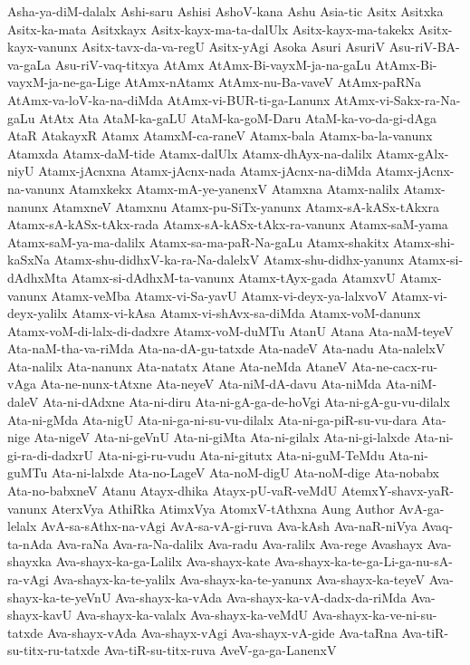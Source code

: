 {Asha-ya-diM-dalalx
Ashi-saru
Ashisi
AshoV-kana
Ashu
Asia-tic
Asitx
Asitxka
Asitx-ka-mata
Asitxkayx
Asitx-kayx-ma-ta-dalUlx
Asitx-kayx-ma-takekx
Asitx-kayx-vanunx
Asitx-tavx-da-va-regU
Asitx-yAgi
Asoka
Asuri
AsuriV
Asu-riV-BA-va-gaLa
Asu-riV-vaq-titxya
AtAmx
AtAmx-Bi-vayxM-ja-na-gaLu
AtAmx-Bi-vayxM-ja-ne-ga-Lige
AtAmx-nAtamx
AtAmx-nu-Ba-vaveV
AtAmx-paRNa
AtAmx-va-loV-ka-na-diMda
AtAmx-vi-BUR-ti-ga-Lanunx
AtAmx-vi-Sakx-ra-Na-gaLu
AtAtx
Ata
AtaM-ka-gaLU
AtaM-ka-goM-Daru
AtaM-ka-vo-da-gi-dAga
AtaR
AtakayxR
Atamx
AtamxM-ca-raneV
Atamx-bala
Atamx-ba-la-vanunx
Atamxda
Atamx-daM-tide
Atamx-dalUlx
Atamx-dhAyx-na-dalilx
Atamx-gAlx-niyU
Atamx-jAcnxna
Atamx-jAcnx-nada
Atamx-jAcnx-na-diMda
Atamx-jAcnx-na-vanunx
Atamxkekx
Atamx-mA-ye-yanenxV
Atamxna
Atamx-nalilx
Atamx-nanunx
AtamxneV
Atamxnu
Atamx-pu-SiTx-yanunx
Atamx-sA-kASx-tAkxra
Atamx-sA-kASx-tAkx-rada
Atamx-sA-kASx-tAkx-ra-vanunx
Atamx-saM-yama
Atamx-saM-ya-ma-dalilx
Atamx-sa-ma-paR-Na-gaLu
Atamx-shakitx
Atamx-shi-kaSxNa
Atamx-shu-didhxV-ka-ra-Na-dalelxV
Atamx-shu-didhx-yanunx
Atamx-si-dAdhxMta
Atamx-si-dAdhxM-ta-vanunx
Atamx-tAyx-gada
AtamxvU
Atamx-vanunx
Atamx-veMba
Atamx-vi-Sa-yavU
Atamx-vi-deyx-ya-lalxvoV
Atamx-vi-deyx-yalilx
Atamx-vi-kAsa
Atamx-vi-shAvx-sa-diMda
Atamx-voM-danunx
Atamx-voM-di-lalx-di-dadxre
Atamx-voM-duMTu
AtanU
Atana
Ata-naM-teyeV
Ata-naM-tha-va-riMda
Ata-na-dA-gu-tatxde
Ata-nadeV
Ata-nadu
Ata-nalelxV
Ata-nalilx
Ata-nanunx
Ata-natatx
Atane
Ata-neMda
AtaneV
Ata-ne-cacx-ru-vAga
Ata-ne-nunx-tAtxne
Ata-neyeV
Ata-niM-dA-davu
Ata-niMda
Ata-niM-daleV
Ata-ni-dAdxne
Ata-ni-diru
Ata-ni-gA-ga-de-hoVgi
Ata-ni-gA-gu-vu-dilalx
Ata-ni-gMda
Ata-nigU
Ata-ni-ga-ni-su-vu-dilalx
Ata-ni-ga-piR-su-vu-dara
Ata-nige
Ata-nigeV
Ata-ni-geVnU
Ata-ni-giMta
Ata-ni-gilalx
Ata-ni-gi-lalxde
Ata-ni-gi-ra-di-dadxrU
Ata-ni-gi-ru-vudu
Ata-ni-gitutx
Ata-ni-guM-TeMdu
Ata-ni-guMTu
Ata-ni-lalxde
Ata-no-LageV
Ata-noM-digU
Ata-noM-dige
Ata-nobabx
Ata-no-babxneV
Atanu
Atayx-dhika
Atayx-pU-vaR-veMdU
AtemxY-shavx-yaR-vanunx
AterxVya
AthiRka
AtimxVya
AtomxV-tAthxna
Aung
Author
AvA-ga-lelalx
AvA-sa-sAthx-na-vAgi
AvA-sa-vA-gi-ruva
Ava-kAsh
Ava-naR-niVya
Avaq-ta-nAda
Ava-raNa
Ava-ra-Na-dalilx
Ava-radu
Ava-ralilx
Ava-rege
Avashayx
Ava-shayxka
Ava-shayx-ka-ga-Lalilx
Ava-shayx-kate
Ava-shayx-ka-te-ga-Li-ga-nu-sA-ra-vAgi
Ava-shayx-ka-te-yalilx
Ava-shayx-ka-te-yanunx
Ava-shayx-ka-teyeV
Ava-shayx-ka-te-yeVnU
Ava-shayx-ka-vAda
Ava-shayx-ka-vA-dadx-da-riMda
Ava-shayx-kavU
Ava-shayx-ka-valalx
Ava-shayx-ka-veMdU
Ava-shayx-ka-ve-ni-su-tatxde
Ava-shayx-vAda
Ava-shayx-vAgi
Ava-shayx-vA-gide
Ava-taRna
Ava-tiR-su-titx-ru-tatxde
Ava-tiR-su-titx-ruva
AveV-ga-ga-LanenxV
}
